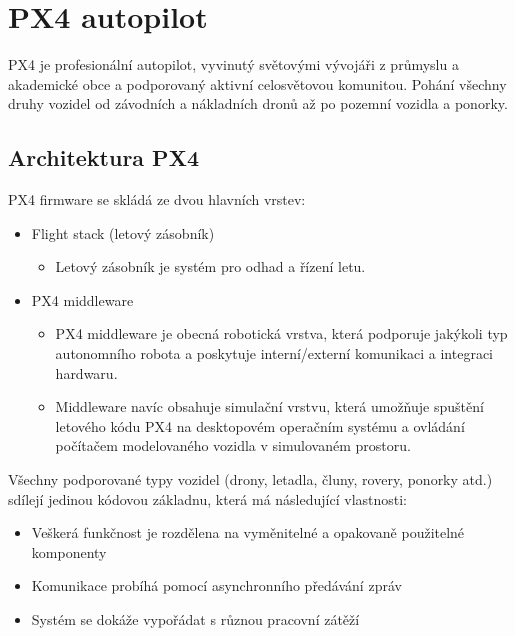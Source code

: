 \chapter{PX4 autopilot}

PX4 je profesionální autopilot, vyvinutý světovými vývojáři z průmyslu a akademické obce a podporovaný aktivní celosvětovou komunitou. Pohání všechny druhy vozidel od závodních a nákladních dronů až po pozemní vozidla a ponorky. 

\section{Architektura PX4}

PX4 firmware se skládá ze dvou hlavních vrstev:
\begin{itemize}
    \item Flight stack (letový zásobník)
    \begin{itemize}
        \item Letový zásobník je systém pro odhad a řízení letu.
    \end{itemize}
    \item PX4 middleware
    \begin{itemize}
        \item PX4 middleware je obecná robotická vrstva, která podporuje jakýkoli typ autonomního robota a poskytuje interní/externí komunikaci a integraci hardwaru.
        \item Middleware navíc obsahuje simulační vrstvu, která umožňuje spuštění letového kódu PX4 na desktopovém operačním systému a ovládání počítačem modelovaného vozidla v simulovaném prostoru.\\
    \end{itemize}
\end{itemize}

Všechny podporované typy vozidel (drony, letadla, čluny, rovery, ponorky atd.) sdílejí jedinou kódovou základnu, která má následující vlastnosti: \cite{PX4main}

\begin{itemize}
    \item Veškerá funkčnost je rozdělena na vyměnitelné a opakovaně použitelné komponenty
    \item Komunikace probíhá pomocí asynchronního předávání zpráv
    \item Systém se dokáže vypořádat s různou pracovní zátěží\\
\end{itemize}

